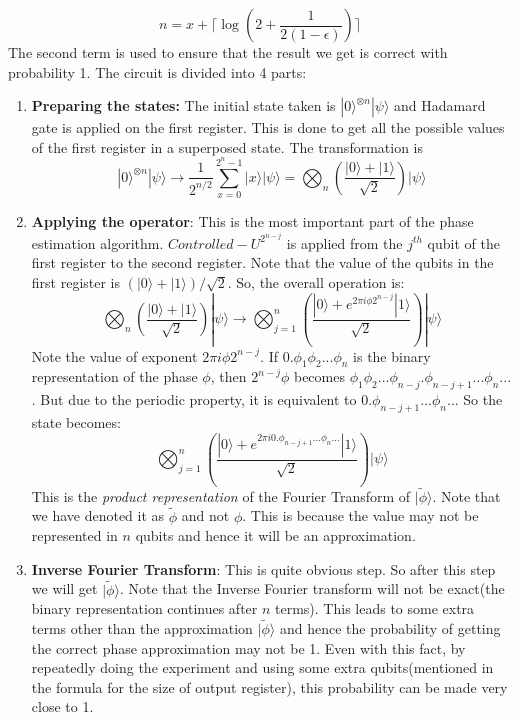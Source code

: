 \begin{equation}
n = x + \Bigg\lceil \log{\left( 2 + \frac{1}{2(1-\epsilon)}\right)} \Bigg\rceil
\end{equation}The second term is used to ensure that the result we get is correct with probability 1.
The circuit is divided into 4 parts:
\begin{enumerate}
\item \textbf{Preparing the states:} The initial state taken is $|0\rangle^{\otimes n}|\psi\rangle$ and Hadamard gate is applied on the first register. This is done to get all the possible values of the first register in a superposed state. The transformation is  
\begin{equation}
|0\rangle^{\otimes n} |\psi \rangle \rightarrow \frac{1}{2^{n/2}} \sum_{x=0}^{2^n -1}|x\rangle  |\psi\rangle = \bigotimes_n \left( \frac{|0\rangle + |1\rangle}{\sqrt{2}} \right) |\psi\rangle
\end{equation}
\item \textbf{Applying the operator}: This is the most important part of the phase estimation algorithm. $Controlled-U^{2^{n-j}}$ is applied from the $j^{th}$ qubit of the first register to the second register. Note that the value of the qubits in the first register is $(|0\rangle + |1\rangle)/\sqrt{2}$.  So, the overall operation is:
\begin{equation}
\bigotimes_n \left( \frac{|0\rangle + |1\rangle}{\sqrt{2}} \right) |\psi\rangle \rightarrow \bigotimes_{j=1}^{n} \left( \frac{|0\rangle + e^{2\pi i \phi 2^{n-j}} |1\rangle}{\sqrt{2}} \right) |\psi\rangle 
\end{equation}
Note the value of exponent $2 \pi i \phi 2^{n-j}$. If $0.\phi_1 \phi_2 ... \phi_n$ is the binary representation of the phase $\phi$, then $2^{n-j} \phi$ becomes $\phi_1\phi_2...\phi_{n-j}.\phi_{n-j+1}... \phi_n... $ . But due to the periodic property, it is equivalent to $0.\phi_{n-j+1}... \phi_n..$. So the state becomes:
\begin{equation}
\bigotimes_{j=1}^{n} \left( \frac{|0\rangle + e^{2\pi i 0.\phi_{n-j+1}...\phi_n...} |1\rangle}{\sqrt{2}} \right) |\psi\rangle 
\end{equation}
This is the \textit{product representation} of the Fourier Transform of $|\tilde{\phi}\rangle$. Note that we have denoted it as $\tilde{\phi}$ and not $\phi$. This is because the value may not be represented in $n$ qubits and hence it will be an approximation.
\item \textbf{Inverse Fourier Transform}: This is quite obvious step. So after this step we will get $|\tilde{\phi}\rangle$. Note that the Inverse Fourier transform will not be exact(the binary representation continues after $n$ terms). This leads to some extra terms other than the approximation $|\tilde{\phi}\rangle$ and hence the probability of getting the correct phase approximation may not be 1. Even with this fact, by repeatedly doing the experiment and using some extra qubits(mentioned in the formula for the size of output register), this probability can be made very close to 1.

\end{enumerate}
